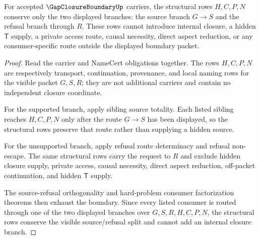 \begin{theorem}
\label{thm:gap-closure-boundary-structural-row-conservation}
For accepted $\GapClosureBoundaryUp$ carriers, the structural rows $H,C,P,N$ conserve only the two displayed branches: the source branch $G \longrightarrow S$ and the refusal branch through $R$. These rows cannot introduce internal closure, a hidden $\mathsf{T}$ supply, a private access route, causal necessity, direct aspect reduction, or any consumer-specific route outside the displayed boundary packet.
\end{theorem}
\begin{proof}
Read the carrier and NameCert obligations together. The rows $H,C,P,N$ are respectively transport, continuation, provenance, and local naming rows for the visible packet $G,S,R$; they are not additional carriers and contain no independent closure coordinate.

For the supported branch, apply sibling source totality. Each listed sibling reaches $H,C,P,N$ only after the route $G \longrightarrow S$ has been displayed, so the structural rows preserve that route rather than supplying a hidden source.

For the unsupported branch, apply refusal route determinacy and refusal non-escape. The same structural rows carry the request to $R$ and exclude hidden closure supply, private access, causal necessity, direct aspect reduction, off-packet continuation, and hidden $\mathsf{T}$ supply.

The source-refusal orthogonality and hard-problem consumer factorization theorems then exhaust the boundary. Since every listed consumer is routed through one of the two displayed branches over $G,S,R,H,C,P,N$, the structural rows conserve the visible source/refusal split and cannot add an internal closure branch.
\end{proof}
